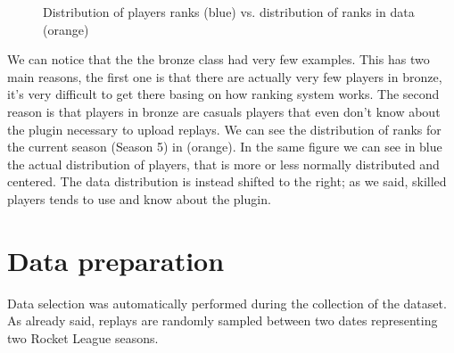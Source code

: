 \begin{figure}[H]
    \label{fig:rank_distr}
    \caption{Distribution of players ranks (blue) vs. distribution of ranks in data (orange)}
\end{figure}

We can notice that the the bronze class had very few examples. This has two main reasons, the first one is that there are actually very few players in bronze, it's very difficult to get there basing on how ranking system works. The second reason is that players in bronze are casuals players that even don't know about the plugin necessary to upload replays. We can see the distribution of ranks for the current season (Season 5) in  (orange). In the same figure we can see in blue the actual distribution of players, that is more or less normally distributed and centered. The data distribution is instead shifted to the right; as we said, skilled players tends to use and know about the plugin.

\section{Data preparation}

Data selection was automatically performed during the collection of the dataset. As already said, replays are randomly sampled between two dates representing two Rocket League seasons.

